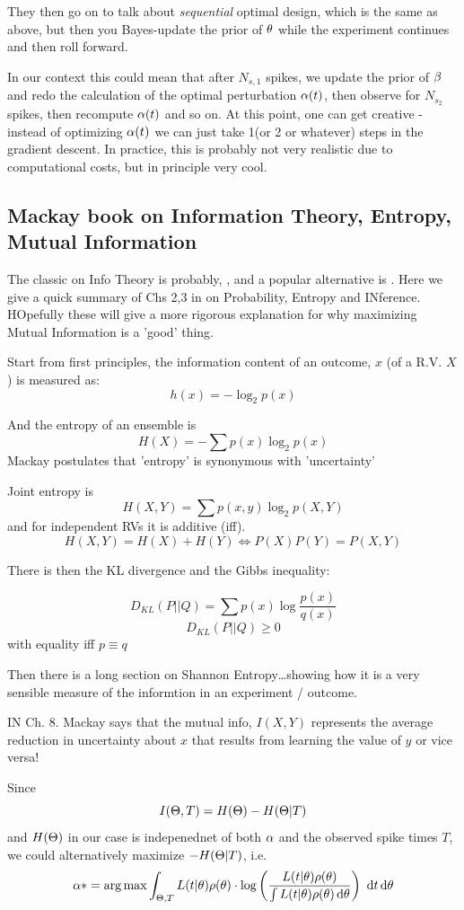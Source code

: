 \documentclass{article}
\begin{document}
They then go on to talk about { \sl sequential } optimal design, which is the
same as above, but then you Bayes-update the prior of ${\theta}$ while the experiment
continues and then roll forward. 

In our context this could mean that after $N_{s,1}$ spikes, we update the prior
of ${\beta}$ and redo the calculation of the optimal perturbation ${\alpha}(t)$, then
observe for $N_{s_2}$ spikes, then recompute ${\alpha}(t)$ and so on. At this point,
one can get creative - instead of optimizing ${\alpha}(t)$ we can just take 1(or 2 or
whatever) steps in the gradient descent. In practice, this is probably
not very realistic due to computational costs, but in principle very cool.

\subsection{Mackay book on Information Theory, Entropy, Mutual
Information}

The classic on Info Theory is probably, \cite{Cover2006}, and a popular
alternative is \cite{MacKay2003}. Here we give a quick summary of Chs 2,3 in
\cite{MacKay2003} on Probability, Entropy and INference. HOpefully these will
give a more rigorous explanation for why maximizing Mutual Information is a
'good' thing. 

Start from first principles, the information content of an outcome, $x$ (of a
  R.V. $X$) is measured as:
  $$ h(x) = -\log_2 p(x)$$

And the entropy of an ensemble is 
$$ H(X) = -\sum p(x) \log_2 p(x)$$
Mackay postulates that 'entropy' is synonymous with 'uncertainty'

Joint entropy is 
$$ H(X,Y) = \sum p(x,y) \log_2 p(X,Y)$$ and for independent RVs it is additive
(iff). 
$$
H(X,Y) =  H(X) + H(Y) \iff P(X)P(Y) = P(X,Y)
$$

There is then the KL divergence  and the Gibbs inequality:

$$D_{KL} (P||Q) = \sum p(x) \log \frac{p(x)}{q(x)}$$
$$D_{KL} (P||Q)  \geq 0$$ with equality iff $p \equiv q$

Then there is a long section on Shannon Entropy\ldots showing how it is a very
sensible measure of the informtion in an experiment / outcome. 

IN Ch. 8. Mackay says that the mutual info, $I(X,Y)$ represents the average
reduction in uncertainty about $x$ that results from learning the value of $y$
or vice versa! 

Since 
$$I({\Theta}, T) = H({\Theta}) - H({\Theta}|T)$$ and $H({\Theta})$ in our case is indepenednet of
both ${\alpha}$ and the observed spike times $T$, we could alternatively maximize
$-H({\Theta}|T)$, i.e.
$$
\a* = \argmax \int_{\Th, T}  L(t|\th) \rho(\th) \cdot
 \log \left( \frac{L(t|\th) \rho(\th)}{ \int L(t|\th) \rho(\th) \intd{\th}}\right) 
 \, \intd{t} \intd{\th}$$
\end{document}
